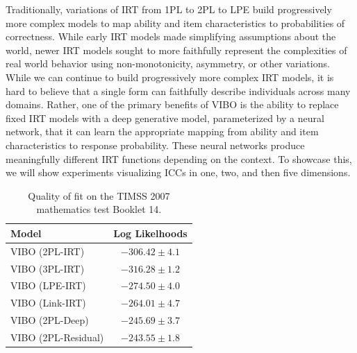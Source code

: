 Traditionally, variations of IRT from 1PL to 2PL to LPE build progressively more complex models to map ability and item characteristics to probabilities of correctness. While early IRT models made simplifying assumptions about the world, newer IRT models sought to more faithfully represent the complexities of real world behavior using non-monotonicity, asymmetry, or other variations.
While we can continue to build progressively more complex IRT models, it is hard to believe that a single form can faithfully describe individuals across many domains. 
Rather, one of the primary benefits of VIBO is the ability to replace fixed IRT models with a deep generative model, parameterized by a neural network, that it can learn the appropriate mapping from ability and item characteristics to response probability. These neural networks produce meaningfully different IRT functions depending on the context.
To showcase this, we will show experiments visualizing ICCs in one, two, and then five dimensions.

\begin{table}
    \caption{Quality of fit on the TIMSS 2007 mathematics test Booklet 14. }
    \label{table:timss:booklet}
    \begin{center}
    \begin{tabular}{lc}
    \hline
    Model & Log Likelhoods \\
    \hline
    VIBO (2PL-IRT) & $-306.42 \pm 4.1$ \\
    VIBO (3PL-IRT) & $-316.28 \pm 1.2$ \\
    VIBO (LPE-IRT) & $-274.50 \pm 4.0$ \\
    VIBO (Link-IRT) & $-264.01 \pm 4.7$ \\
    VIBO (2PL-Deep) & $-245.69 \pm 3.7$ \\
    VIBO (2PL-Residual) & $\mathbf{-243.55} \pm 1.8$ \\
    \hline
    \end{tabular}
    \end{center}
\end{table}

